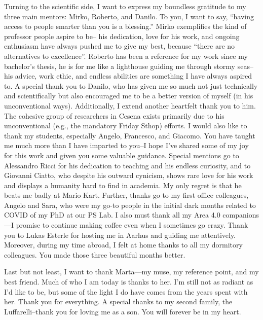 Turning to the scientific side, 
 I want to express my boundless gratitude to my three main mentors: Mirko, Roberto, and Danilo. 
 To you, I want to say, ``having access to people smarter than you is a blessing.'' 
% 
Mirko exemplifies the kind of professor people aspire to be--
 his dedication, love for his work, 
 and ongoing enthusiasm have always pushed me to give my best, because ``there are no alternatives to excellence''. 
 Roberto has been a reference for my work since my bachelor's thesis, 
 he is for me like a lighthouse guiding me through stormy seas--his advice, work ethic, and endless abilities are something I have always aspired to. 
 A special thank you to Danilo, 
 who has given me so much not just technically and scientifically 
 but also encouraged me to be a better version of myself (in his unconventional ways).
 Additionally, I extend another heartfelt thank you to him. The cohesive group of researchers in Cesena exists primarily due to his unconventional (e.g., the mandatory Friday Sthop) efforts.
%
I would also like to thank my students, especially Angelo, Francesco, and Giacomo. 
 You have taught me much more than I have imparted to you--I hope I've shared some of my joy for this work and given you some valuable guidance.
%
Special mentions go to Alessandro Ricci for his dedication to teaching and his endless curiosity, 
 and to Giovanni Ciatto, who despite his outward cynicism, shows rare love for his work and displays a humanity hard to find in academia. 
 My only regret is that he beats me badly at Mario Kart.
%
Further, thanks go to my first office colleagues, Angelo and Sara, who were my go-to people in the initial dark months related to COVID of my PhD at our PS Lab. 
I also must thank all my Area 4.0 companions—I promise to continue making coffee even when I sometimes go crazy.
%
Thank you to Lukas Esterle for hosting me in Aarhus and guiding me attentively. 
Moreover, during my time abroad, I felt at home thanks to all my dormitory colleagues. You made those three beautiful months better.

Last but not least, I want to thank Marta—my muse, my reference point, and my best friend. Much of who I am today is thanks to her. I'm still not as radiant as I'd like to be, but some of the light I do have comes from the years spent with her. Thank you for everything.
%
A special thanks to my second family, the Luffarelli--thank you for loving me as a son. You will forever be in my heart.
